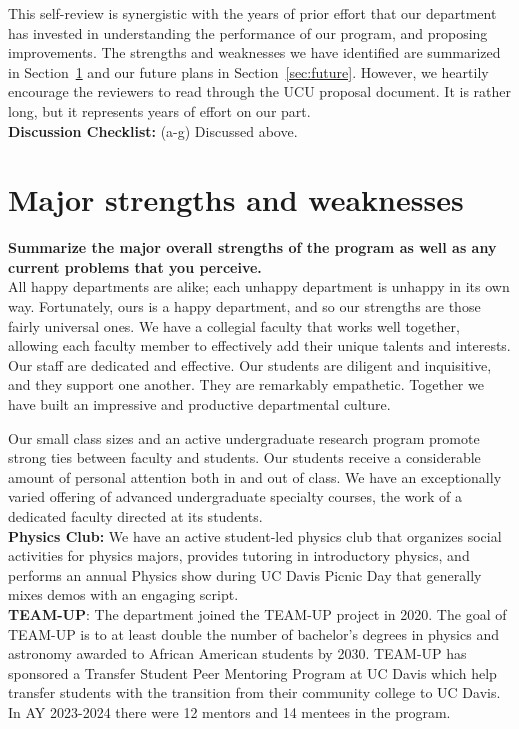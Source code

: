 \documentclass[12pt]{article}
\begin{document}
This self-review is synergistic with the years of prior effort that
our department has invested in understanding the performance of our
program, and proposing improvements.  The strengths and weaknesses we
have identified are summarized in Section~\ref{sec:snws} and our
future plans in Section~\ref{sec:future}.  However, we heartily
encourage the reviewers to read through the UCU proposal document.  It
is rather long, but it represents years of effort on our part.\\[3pt]

\noindent
{\bf Discussion Checklist:} (a-g) Discussed above.

\newpage
\section{Major strengths and weaknesses}
\label{sec:snws}

{\bf Summarize the major overall strengths of the program as well as
  any current problems that you perceive.}\\[3pt]

\noindent
All happy departments are alike; each unhappy department is unhappy in
its own way.  Fortunately, ours is a happy department, and so our
strengths are those fairly universal ones.  We have a collegial
faculty that works well together, allowing each faculty member to
effectively add their unique talents and interests.  Our staff are
dedicated and effective.  Our students are diligent and inquisitive,
and they support one another.  They are remarkably empathetic.
Together we have built an impressive and productive departmental
culture.

Our small class sizes and an active undergraduate research program
promote strong ties between faculty and students.  Our students
receive a considerable amount of personal attention both in and out of
class.  We have an exceptionally varied offering of advanced
undergraduate specialty courses, the work of a dedicated faculty
directed at its students.\\[3pt]

\noindent
{\bf Physics Club:} We have an active student-led physics club that organizes social activities for physics majors, provides tutoring in introductory physics, and performs an annual Physics show during UC Davis Picnic Day that generally mixes demos with an engaging script.\\[3pt]

\noindent
{\bf TEAM-UP}:
The department joined the TEAM-UP project in 2020.  The goal of TEAM-UP is to at least double the number of bachelor’s degrees in physics and astronomy awarded to African American students by 2030.
TEAM-UP has sponsored a Transfer Student Peer Mentoring Program at UC Davis which help transfer students with the transition from their community college to UC Davis.  In AY 2023-2024 there were 12 mentors and 14 mentees in the program.\\[3pt]
\end{document}
